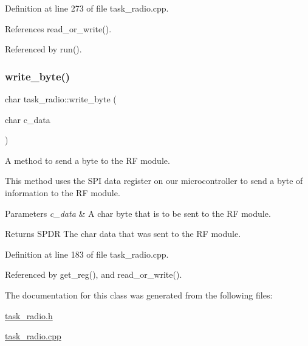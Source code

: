 Definition at line 273 of file task\+\_\+radio.\+cpp.



References read\+\_\+or\+\_\+write().



Referenced by run().

\mbox{\label{classtask__radio_ae18b22460053f286ad2327b785cfa018}} 
\subsubsection{\texorpdfstring{write\+\_\+byte()}{write\_byte()}}
{\footnotesize\ttfamily char task\+\_\+radio\+::write\+\_\+byte (\begin{DoxyParamCaption}\item[{char}]{c\+\_\+data }\end{DoxyParamCaption})\hspace{0.3cm}{\ttfamily [protected]}}



A method to send a byte to the RF module. 

This method uses the S\+PI data register on our microcontroller to send a byte of information to the RF module. 
\begin{DoxyParams}{Parameters}
{\em c\+\_\+data} & A char byte that is to be sent to the RF module. \\
\hline
\end{DoxyParams}
\begin{DoxyReturn}{Returns}
S\+P\+DR The char data that was sent to the RF module. 
\end{DoxyReturn}


Definition at line 183 of file task\+\_\+radio.\+cpp.



Referenced by get\+\_\+reg(), and read\+\_\+or\+\_\+write().



The documentation for this class was generated from the following files\+:\begin{DoxyCompactItemize}
\item 
\mbox{\hyperlink{task__radio_8h}{task\+\_\+radio.\+h}}\item 
\mbox{\hyperlink{task__radio_8cpp}{task\+\_\+radio.\+cpp}}\end{DoxyCompactItemize}
